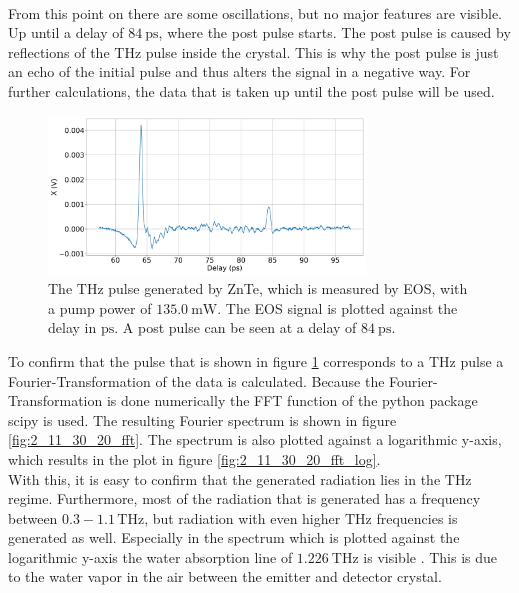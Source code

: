 \\
From this point on there are some oscillations, but no major features are visible. %
Up until a delay of $\SI{84}{\pico\second}$, where the post pulse starts.
The post pulse is caused by reflections of the $\si{\tera\hertz}$ pulse inside the crystal.
This is why the post pulse is just an echo of the initial pulse and thus alters the signal in a negative way.
For further calculations, the data that is taken up until the post pulse will be used.
\begin{figure}
    \centering
    \includegraphics[width=0.75\textwidth]{Plots/2_11_30_20normalX.pdf}
    \caption{The $\si{\tera\hertz}$ pulse generated by ZnTe, which is measured by EOS, with a pump power of $\SI{135.0}{\milli\W}$.
    The EOS signal is plotted against the delay in $\si{\pico\second}$.
    A post pulse can be seen at a delay of $\SI{84}{\pico\second}$.}
    \label{ZnTe:2_11_30_20_signal}
\end{figure}
\FloatBarrier
To confirm that the pulse that is shown in figure \ref{ZnTe:2_11_30_20_signal} corresponds to a $\si{\tera\hertz}$ pulse a Fourier-Transformation of the data is calculated. %
Because the Fourier-Transformation is done numerically the FFT function of the python package scipy \cite{scipy} is used.
The resulting Fourier spectrum is shown in figure \ref{fig:2_11_30_20_fft}.
The spectrum is also plotted against a logarithmic y-axis, which results in the plot in figure \ref{fig:2_11_30_20_fft_log}.
\\
With this, it is easy to confirm that the generated radiation lies in the $\si{\tera\hertz}$ regime.
Furthermore, most of the radiation that is generated has a frequency between $0.3-1.1\,\si{\tera\hertz}$, but radiation with even higher $\si{\tera\hertz}$ frequencies is generated as well.
Especially in the spectrum which is plotted against the logarithmic y-axis the water absorption line of $\SI{1.226}{\tera\hertz}$ is visible \cite{water_absorption}.
This is due to the water vapor in the air between the emitter and detector crystal.
